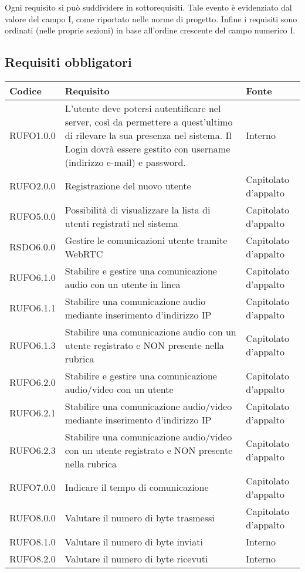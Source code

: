 		Ogni requisito si può suddividere in sottorequisiti. Tale evento è evidenziato dal valore del campo I, come riportato nelle norme di progetto. Infine i requisiti sono ordinati (nelle proprie sezioni) in base all'ordine crescente del campo numerico I.
\subsection{Requisiti obbligatori}

\begin{longtable}{lp{}l}
\toprule Codice & Requisito & Fonte\\
\midrule
RUFO1.0.0 & L'utente deve potersi autentificare nel server, così da permettere a quest'ultimo di rilevare la sua presenza nel sistema. Il Login dovrà essere gestito con username (indirizzo e-mail) e password. & Interno \\
RUFO2.0.0 & Registrazione del nuovo utente & Capitolato d'appalto \\
RUFO5.0.0 & Possibilità di visualizzare la lista di utenti registrati nel sistema & Capitolato d'appalto \\
RSDO6.0.0 & Gestire le comunicazioni utente tramite WebRTC & Capitolato d'appalto \\
RUFO6.1.0 & Stabilire e gestire una comunicazione audio con un utente in linea & Capitolato d'appalto \\
RUFO6.1.1 & Stabilire una comunicazione audio mediante inserimento d'indirizzo IP & Capitolato d'appalto \\
RUFO6.1.3 & Stabilire una comunicazione audio con un utente registrato e NON presente nella rubrica & Capitolato d'appalto \\
RUFO6.2.0 & Stabilire e gestire  una comunicazione audio/video con un utente & Capitolato d'appalto \\
RUFO6.2.1 & Stabilire una comunicazione audio/video mediante inserimento d'indirizzo IP & Capitolato d'appalto \\
RUFO6.2.3 & Stabilire una comunicazione audio/video con un utente registrato e NON presente nella rubrica & Capitolato d'appalto \\
RUFO7.0.0 & Indicare il tempo di comunicazione & Capitolato d'appalto \\
RUFO8.0.0 & Valutare il numero di byte trasmessi & Capitolato d'appalto \\
RUFO8.1.0 & Valutare il numero di byte inviati & Interno \\
RUFO8.2.0 & Valutare il numero di byte ricevuti & Interno \\

\end{longtable}
